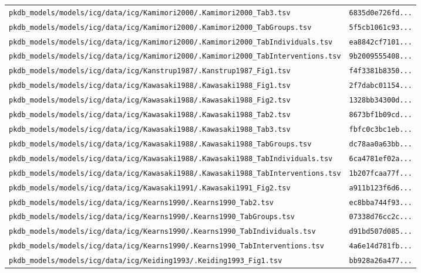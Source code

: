 \documentclass{article}
\begin{document}
\begin{longtable}{ll}
\texttt{pkdb\_models/models/icg/data/icg/Kamimori2000/.Kamimori2000\_Tab3.tsv} & \texttt{6835d0e726fd...} \\
\texttt{pkdb\_models/models/icg/data/icg/Kamimori2000/.Kamimori2000\_TabGroups.tsv} & \texttt{5f5cb1061c93...} \\
\texttt{pkdb\_models/models/icg/data/icg/Kamimori2000/.Kamimori2000\_TabIndividuals.tsv} & \texttt{ea8842cf7101...} \\
\texttt{pkdb\_models/models/icg/data/icg/Kamimori2000/.Kamimori2000\_TabInterventions.tsv} & \texttt{9b2009555408...} \\
\texttt{pkdb\_models/models/icg/data/icg/Kanstrup1987/.Kanstrup1987\_Fig1.tsv} & \texttt{f4f3381b8350...} \\
\texttt{pkdb\_models/models/icg/data/icg/Kawasaki1988/.Kawasaki1988\_Fig1.tsv} & \texttt{2f7dabc01154...} \\
\texttt{pkdb\_models/models/icg/data/icg/Kawasaki1988/.Kawasaki1988\_Fig2.tsv} & \texttt{1328bb34300d...} \\
\texttt{pkdb\_models/models/icg/data/icg/Kawasaki1988/.Kawasaki1988\_Tab2.tsv} & \texttt{8673bf1b09cd...} \\
\texttt{pkdb\_models/models/icg/data/icg/Kawasaki1988/.Kawasaki1988\_Tab3.tsv} & \texttt{fbfc0c3bc1eb...} \\
\texttt{pkdb\_models/models/icg/data/icg/Kawasaki1988/.Kawasaki1988\_TabGroups.tsv} & \texttt{dc78aa0a63bb...} \\
\texttt{pkdb\_models/models/icg/data/icg/Kawasaki1988/.Kawasaki1988\_TabIndividuals.tsv} & \texttt{6ca4781ef02a...} \\
\texttt{pkdb\_models/models/icg/data/icg/Kawasaki1988/.Kawasaki1988\_TabInterventions.tsv} & \texttt{1b207fcaa77f...} \\
\texttt{pkdb\_models/models/icg/data/icg/Kawasaki1991/.Kawasaki1991\_Fig2.tsv} & \texttt{a911b123f6d6...} \\
\texttt{pkdb\_models/models/icg/data/icg/Kearns1990/.Kearns1990\_Tab2.tsv} & \texttt{ec8bba744f93...} \\
\texttt{pkdb\_models/models/icg/data/icg/Kearns1990/.Kearns1990\_TabGroups.tsv} & \texttt{07338d76cc2c...} \\
\texttt{pkdb\_models/models/icg/data/icg/Kearns1990/.Kearns1990\_TabIndividuals.tsv} & \texttt{d91bd507d085...} \\
\texttt{pkdb\_models/models/icg/data/icg/Kearns1990/.Kearns1990\_TabInterventions.tsv} & \texttt{4a6e14d781fb...} \\
\texttt{pkdb\_models/models/icg/data/icg/Keiding1993/.Keiding1993\_Fig1.tsv} & \texttt{bb928a26a477...} \\

\end{longtable}
\end{document}
